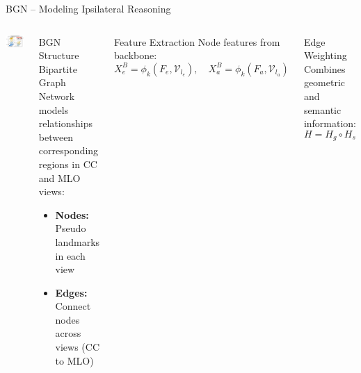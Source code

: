 \documentclass[8pt,aspectratio=169,xcolor=dvipsnames]{beamer}
\begin{document}
\begin{frame}{BGN – Modeling Ipsilateral Reasoning}
    \begin{columns}
        \includegraphics[width=\linewidth]{bipartite.png}
        
        \begin{block}{BGN Structure}
        Bipartite Graph Network models relationships between corresponding regions in CC and MLO views:
        \begin{itemize}
            \item \textbf{Nodes:} Pseudo landmarks in each view
            \item \textbf{Edges:} Connect nodes across views (CC to MLO)
        \end{itemize}
        \end{block}
        
        \begin{block}{Feature Extraction}
        Node features from backbone:
        \[
        X_e^B = \phi_k(F_e, \mathcal{V}_{l_e}), \quad X_a^B = \phi_k(F_a, \mathcal{V}_{l_a})
        \]
        \end{block}
        
        \begin{alertblock}{Edge Weighting}
        Combines geometric and semantic information:
        \[
        H = H_g \circ H_s
        \]
        \end{alertblock}
    \end{columns}
\end{frame}
\end{document}
